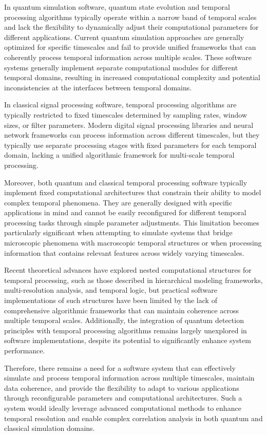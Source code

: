 \documentclass[12pt,letterpaper]{article}
\begin{document}
In quantum simulation software, quantum state evolution and temporal processing algorithms typically operate within a narrow band of temporal scales and lack the flexibility to dynamically adjust their computational parameters for different applications. Current quantum simulation approaches are generally optimized for specific timescales and fail to provide unified frameworks that can coherently process temporal information across multiple scales. These software systems generally implement separate computational modules for different temporal domains, resulting in increased computational complexity and potential inconsistencies at the interfaces between temporal domains.

In classical signal processing software, temporal processing algorithms are typically restricted to fixed timescales determined by sampling rates, window sizes, or filter parameters. Modern digital signal processing libraries and neural network frameworks can process information across different timescales, but they typically use separate processing stages with fixed parameters for each temporal domain, lacking a unified algorithmic framework for multi-scale temporal processing.

Moreover, both quantum and classical temporal processing software typically implement fixed computational architectures that constrain their ability to model complex temporal phenomena. They are generally designed with specific applications in mind and cannot be easily reconfigured for different temporal processing tasks through simple parameter adjustments. This limitation becomes particularly significant when attempting to simulate systems that bridge microscopic phenomena with macroscopic temporal structures or when processing information that contains relevant features across widely varying timescales.

Recent theoretical advances have explored nested computational structures for temporal processing, such as those described in hierarchical modeling frameworks, multi-resolution analysis, and temporal logic, but practical software implementations of such structures have been limited by the lack of comprehensive algorithmic frameworks that can maintain coherence across multiple temporal scales. Additionally, the integration of quantum detection principles with temporal processing algorithms remains largely unexplored in software implementations, despite its potential to significantly enhance system performance.

Therefore, there remains a need for a software system that can effectively simulate and process temporal information across multiple timescales, maintain data coherence, and provide the flexibility to adapt to various applications through reconfigurable parameters and computational architectures. Such a system would ideally leverage advanced computational methods to enhance temporal resolution and enable complex correlation analysis in both quantum and classical simulation domains.
\end{document}
